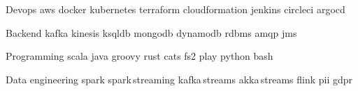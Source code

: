
\begin{cvskills}

  \cvskill
    {Devops} %
    {aws {} docker {} kubernetes {} terraform {} cloudformation {} jenkins {} circleci {} argocd} %

  \cvskill
    {Backend} %
    {kafka {} kinesis {} ksqldb {} mongodb {} dynamodb {} rdbms {} amqp {} jms} %

  \cvskill
    {Programming} %
    {scala {} java {} groovy {} rust {} cats {} fs2 {} play {} python {} bash} %

\cvskill
    {Data engineering} %
    {spark {} spark\,streaming {} kafka\,streams {} akka\,streams {} flink {} pii {} gdpr} %

\end{cvskills}
